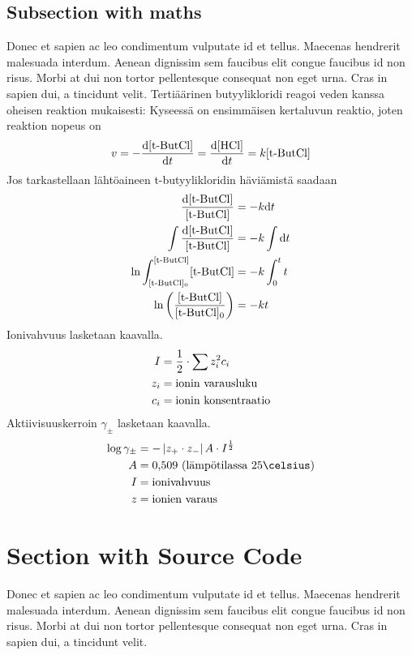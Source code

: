 \subsection{Subsection with \Gls{maths}}
Donec et sapien ac leo condimentum vulputate id et tellus. Maecenas hendrerit malesuada interdum. Aenean dignissim sem faucibus elit congue faucibus id non risus. Morbi at dui non tortor pellentesque consequat non eget urna. Cras in sapien dui, a tincidunt velit. Tertiäärinen butyylikloridi reagoi veden kanssa oheisen reaktion mukaisesti:
Kyseessä on ensimmäisen kertaluvun reaktio, joten reaktion nopeus on
\begin{align}
v=-\frac{\mathrm{d}[\textnormal{t-ButCl}]}{\mathrm{d}t}=\frac{\mathrm{d}[\textnormal{HCl}]}{\mathrm{d}t}=k[\textnormal{t-ButCl}]
\end{align}
Jos tarkastellaan lähtöaineen t-butyylikloridin häviämistä saadaan
\begin{align}
\frac{\mathrm{d}[\textnormal{t-ButCl}]}{[\textnormal{t-ButCl}]}&=-k\mathrm{d}t \\
\int \frac{\mathrm{d}[\textnormal{t-ButCl}]}{[\textnormal{t-ButCl}]}&=-k \int \mathrm{d}t \\
\ln \int_{[\textnormal{t-ButCl}]_0}^{[\textnormal{t-ButCl}]} [\textnormal{t-ButCl}]&=-k\int_0^t t \\
\ln \left( \frac{[\textnormal{t-ButCl}]}{[\textnormal{t-ButCl}]_0} \right)&=-kt
\end{align}
Ionivahvuus lasketaan kaavalla.
\begin{align}
I&=\frac{1}{2}\cdot\sum z_i^2c_i \\
z_i&= \textnormal{ionin varausluku} \\
c_i&= \textnormal{ionin konsentraatio}
\end{align}
Aktiivisuuskerroin $\gamma_\pm$ lasketaan kaavalla.
\begin{align}
\log \gamma_\pm &= -\left|z_+\cdot z_-\right|A\cdot I^{\frac{1}{2}} \\
A &= \tn{0,509 (lämpötilassa 25\celsius}) \\
I &= \tn{ionivahvuus} \\
z &= \tn{ionien varaus}
\end{align}

\section{Section with Source Code}
Donec et sapien ac leo condimentum vulputate id et tellus. Maecenas hendrerit malesuada interdum. Aenean dignissim sem faucibus elit congue faucibus id non risus. Morbi at dui non tortor pellentesque consequat non eget urna. Cras in sapien dui, a tincidunt velit.

